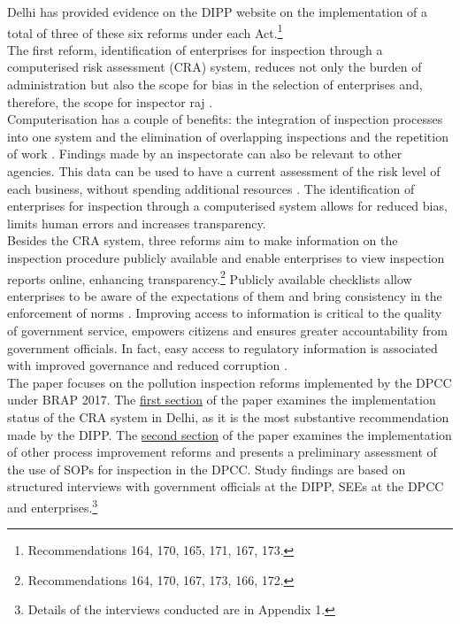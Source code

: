 \documentclass[a4paper, 12pt]{article}
\begin{document}
                 Delhi has provided evidence on the DIPP website on the implementation of a total of three of these six reforms under each Act.\footnote{Recommendations 164, 170, 165, 171, 167, 173.} \\
                 
                 The first reform, identification of enterprises for inspection through a computerised risk assessment (CRA) system, reduces not only the burden of administration \parencite{DIPPd} but also the scope for bias in the selection of enterprises and, therefore, the scope for inspector raj \parencite{livemintnews}. \\
                 
                 Computerisation has a couple of benefits: the integration of inspection processes into one system and the elimination of overlapping inspections and the repetition of work \parencite{PWC}. Findings made by an inspectorate can also be relevant to other agencies. This data can be used to have a current assessment of the risk level of each business, without spending additional resources \parencite{OECD14}. The identification of enterprises for inspection through a computerised system allows for reduced bias, limits human errors and increases transparency. \\
                 
                 Besides the CRA system, three reforms aim to make information on the inspection procedure publicly available and enable enterprises to view inspection reports online, enhancing transparency.\footnote{Recommendations 164, 170, 167, 173, 166, 172.} Publicly available checklists allow enterprises to be aware of the expectations of them and bring consistency in the enforcement of norms \parencite{blancflorentin}. Improving access to information is critical to the quality of government service, empowers citizens and ensures greater accountability from government officials. In fact, easy access to regulatory information is associated with improved governance and reduced corruption \parencite{Saltane}. \\
                 
                 The paper focuses on the pollution inspection reforms implemented by the DPCC under BRAP 2017. The \hyperref[sec:1]{first section} of the paper examines the implementation status of the CRA system in Delhi, as it is the most substantive recommendation made by the DIPP. The \hyperref[sec:2]{second section} of the paper examines the implementation of other process improvement reforms and presents a preliminary assessment of the use of SOPs for inspection in the DPCC. Study findings are based on structured interviews with government officials at the DIPP, SEEs at the DPCC and enterprises.\footnote{Details of the interviews conducted are in Appendix 1.} 
                 
\end{document}
